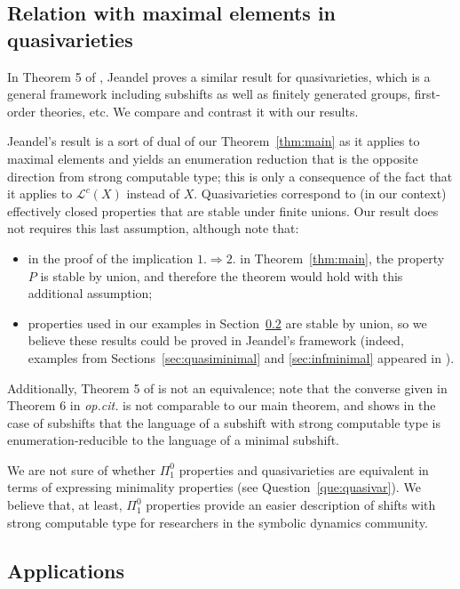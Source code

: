 \documentclass[french,american]{article}
\theoremstyle{plain}
\theoremstyle{definition}
\theoremstyle{remark}
\theoremstyle{plain}
\begin{document}
\subsection{Relation with maximal elements in quasivarieties}\label{sec:quasivar}

In Theorem 5 of \cite{jeandel2017enumeration}, Jeandel proves a similar result for quasivarieties, which is a general framework including subshifts as well as finitely generated groups, first-order theories, etc. We compare and contrast it with our results.

Jeandel's result is a sort of dual of our Theorem~\ref{thm:main} as it applies to maximal elements and yields an enumeration reduction that is the opposite direction from strong computable type; this is only a consequence of the fact that it applies to $\mathcal{L}^c(X)$ instead of $X$. Quasivarieties correspond to (in our context) effectively closed properties that are stable under finite unions. Our result does not requires this last assumption, although note that:
\begin{itemize}
\item in the proof of the implication $1.\Rightarrow 2.$ in Theorem~\ref{thm:main}, the property $P$ is stable by union, and therefore the theorem would hold with this additional assumption;
\item properties used in our examples in Section~\ref{subsec:Application} are stable by union, so we believe these results could be proved in Jeandel's framework (indeed, examples from Sections~\ref{sec:quasiminimal} and \ref{sec:infminimal} appeared in \cite{jeandel2017enumeration}).
\end{itemize}

Additionally, Theorem 5 of \cite{jeandel2017enumeration} is not an equivalence; note that the converse given in Theorem 6 in \emph{op.cit.} is not comparable to our main theorem, and shows in the case of subshifts that the language of a subshift with strong computable type is enumeration-reducible to the language of a minimal subshift.

We are not sure of whether $\Pi_1^0$ properties and quasivarieties are equivalent in terms of expressing minimality properties (see Question~\ref{que:quasivar}). We believe that, at least, $\Pi_1^0$ properties provide an easier description of shifts with strong computable type for researchers in the symbolic dynamics community.


\subsection{Applications}\label{subsec:Application}
\end{document}
